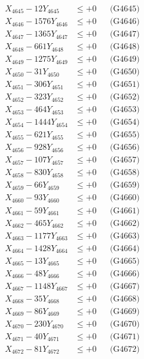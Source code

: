 \documentclass[a4paper,10pt]{article}
\begin{document}
{\begin{align}
X_{4645} - 12Y_{4645} &\leq +0 && \text{(G4645)} \\
X_{4646} - 1576Y_{4646} &\leq +0 && \text{(G4646)} \\
X_{4647} - 1365Y_{4647} &\leq +0 && \text{(G4647)} \\
X_{4648} - 661Y_{4648} &\leq +0 && \text{(G4648)} \\
X_{4649} - 1275Y_{4649} &\leq +0 && \text{(G4649)} \\
X_{4650} - 31Y_{4650} &\leq +0 && \text{(G4650)} \\
\allowbreak
X_{4651} - 306Y_{4651} &\leq +0 && \text{(G4651)} \\
X_{4652} - 323Y_{4652} &\leq +0 && \text{(G4652)} \\
X_{4653} - 464Y_{4653} &\leq +0 && \text{(G4653)} \\
X_{4654} - 1444Y_{4654} &\leq +0 && \text{(G4654)} \\
X_{4655} - 621Y_{4655} &\leq +0 && \text{(G4655)} \\
X_{4656} - 928Y_{4656} &\leq +0 && \text{(G4656)} \\
X_{4657} - 107Y_{4657} &\leq +0 && \text{(G4657)} \\
X_{4658} - 830Y_{4658} &\leq +0 && \text{(G4658)} \\
X_{4659} - 66Y_{4659} &\leq +0 && \text{(G4659)} \\
X_{4660} - 93Y_{4660} &\leq +0 && \text{(G4660)} \\
\allowbreak
X_{4661} - 59Y_{4661} &\leq +0 && \text{(G4661)} \\
X_{4662} - 465Y_{4662} &\leq +0 && \text{(G4662)} \\
X_{4663} - 1177Y_{4663} &\leq +0 && \text{(G4663)} \\
X_{4664} - 1428Y_{4664} &\leq +0 && \text{(G4664)} \\
X_{4665} - 13Y_{4665} &\leq +0 && \text{(G4665)} \\
X_{4666} - 48Y_{4666} &\leq +0 && \text{(G4666)} \\
X_{4667} - 1148Y_{4667} &\leq +0 && \text{(G4667)} \\
X_{4668} - 35Y_{4668} &\leq +0 && \text{(G4668)} \\
X_{4669} - 86Y_{4669} &\leq +0 && \text{(G4669)} \\
X_{4670} - 230Y_{4670} &\leq +0 && \text{(G4670)} \\
\allowbreak
X_{4671} - 40Y_{4671} &\leq +0 && \text{(G4671)} \\
X_{4672} - 81Y_{4672} &\leq +0 && \text{(G4672)} \\

\end{align}}
\end{document}
